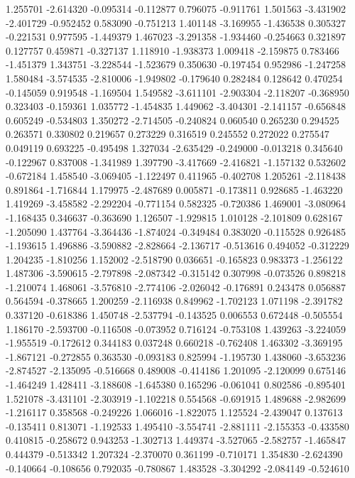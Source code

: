1.255701
-2.614320
-0.095314
-0.112877
0.796075
-0.911761
1.501563
-3.431902
-2.401729
-0.952452
0.583090
-0.751213
1.401148
-3.169955
-1.436538
0.305327
-0.221531
0.977595
-1.449379
1.467023
-3.291358
-1.934460
-0.254663
0.321897
0.127757
0.459871
-0.327137
1.118910
-1.938373
1.009418
-2.159875
0.783466
-1.451379
1.343751
-3.228544
-1.523679
0.350630
-0.197454
0.952986
-1.247258
1.580484
-3.574535
-2.810006
-1.949802
-0.179640
0.282484
0.128642
0.470254
-0.145059
0.919548
-1.169504
1.549582
-3.611101
-2.903304
-2.118207
-0.368950
0.323403
-0.159361
1.035772
-1.454835
1.449062
-3.404301
-2.141157
-0.656848
0.605249
-0.534803
1.350272
-2.714505
-0.240824
0.060540
0.265230
0.294525
0.263571
0.330802
0.219657
0.273229
0.316519
0.245552
0.272022
0.275547
0.049119
0.693225
-0.495498
1.327034
-2.635429
-0.249000
-0.013218
0.345640
-0.122967
0.837008
-1.341989
1.397790
-3.417669
-2.416821
-1.157132
0.532602
-0.672184
1.458540
-3.069405
-1.122497
0.411965
-0.402708
1.205261
-2.118438
0.891864
-1.716844
1.179975
-2.487689
0.005871
-0.173811
0.928685
-1.463220
1.419269
-3.458582
-2.292204
-0.771154
0.582325
-0.720386
1.469001
-3.080964
-1.168435
0.346637
-0.363690
1.126507
-1.929815
1.010128
-2.101809
0.628167
-1.205090
1.437764
-3.364436
-1.874024
-0.349484
0.383020
-0.115528
0.926485
-1.193615
1.496886
-3.590882
-2.828664
-2.136717
-0.513616
0.494052
-0.312229
1.204235
-1.810256
1.152002
-2.518790
0.036651
-0.165823
0.983373
-1.256122
1.487306
-3.590615
-2.797898
-2.087342
-0.315142
0.307998
-0.073526
0.898218
-1.210074
1.468061
-3.576810
-2.774106
-2.026042
-0.176891
0.243478
0.056887
0.564594
-0.378665
1.200259
-2.116938
0.849962
-1.702123
1.071198
-2.391782
0.337120
-0.618386
1.450748
-2.537794
-0.143525
0.006553
0.672448
-0.505554
1.186170
-2.593700
-0.116508
-0.073952
0.716124
-0.753108
1.439263
-3.224059
-1.955519
-0.172612
0.344183
0.037248
0.660218
-0.762408
1.463302
-3.369195
-1.867121
-0.272855
0.363530
-0.093183
0.825994
-1.195730
1.438060
-3.653236
-2.874527
-2.135095
-0.516668
0.489008
-0.414186
1.201095
-2.120099
0.675146
-1.464249
1.428411
-3.188608
-1.645380
0.165296
-0.061041
0.802586
-0.895401
1.521078
-3.431101
-2.303919
-1.102218
0.554568
-0.691915
1.489688
-2.982699
-1.216117
0.358568
-0.249226
1.066016
-1.822075
1.125524
-2.439047
0.137613
-0.135411
0.813071
-1.192533
1.495410
-3.554741
-2.881111
-2.155353
-0.433580
0.410815
-0.258672
0.943253
-1.302713
1.449374
-3.527065
-2.582757
-1.465847
0.444379
-0.513342
1.207324
-2.370070
0.361199
-0.710171
1.354830
-2.624390
-0.140664
-0.108656
0.792035
-0.780867
1.483528
-3.304292
-2.084149
-0.524610
